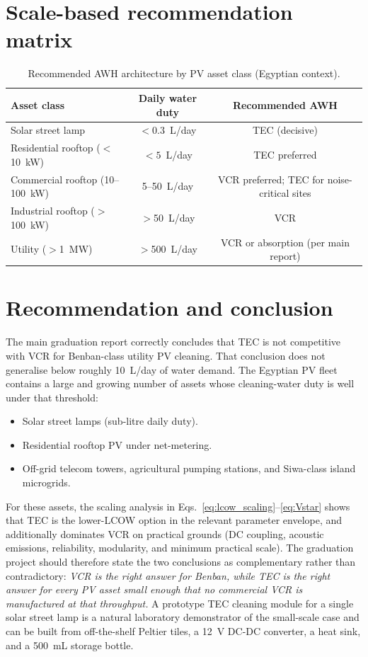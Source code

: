 \documentclass[11pt,a4paper]{article}
\begin{document}
\section{Scale-based recommendation matrix}
\begin{table}[h]
\centering
\caption{Recommended AWH architecture by PV asset class (Egyptian context).}
\begin{tabular}{@{}lcc@{}}
\toprule
\textbf{Asset class} & \textbf{Daily water duty} & \textbf{Recommended AWH} \\
\midrule
Solar street lamp                & $<0.3$~L/day            & TEC (decisive) \\
Residential rooftop ($<$10~kW)   & $<5$~L/day              & TEC preferred \\
Commercial rooftop (10--100~kW)  & 5--50~L/day             & VCR preferred; TEC for noise-critical sites \\
Industrial rooftop ($>$100~kW)   & $>$50~L/day             & VCR \\
Utility ($>$1~MW)                & $>$500~L/day            & VCR or absorption (per main report) \\
\bottomrule
\end{tabular}
\end{table}

\section{Recommendation and conclusion}
The main graduation report correctly concludes that TEC is not competitive with VCR for Benban-class utility PV cleaning. That conclusion does not generalise below roughly 10~L/day of water demand. The Egyptian PV fleet contains a large and growing number of assets whose cleaning-water duty is well under that threshold:
\begin{itemize}[nosep]
\item Solar street lamps (sub-litre daily duty).
\item Residential rooftop PV under net-metering.
\item Off-grid telecom towers, agricultural pumping stations, and Siwa-class island microgrids.
\end{itemize}
For these assets, the scaling analysis in Eqs.~\eqref{eq:lcow_scaling}--\eqref{eq:Vstar} shows that TEC is the lower-LCOW option in the relevant parameter envelope, and additionally dominates VCR on practical grounds (DC coupling, acoustic emissions, reliability, modularity, and minimum practical scale). The graduation project should therefore state the two conclusions as complementary rather than contradictory: \emph{VCR is the right answer for Benban, while TEC is the right answer for every PV asset small enough that no commercial VCR is manufactured at that throughput.} A prototype TEC cleaning module for a single solar street lamp is a natural laboratory demonstrator of the small-scale case and can be built from off-the-shelf Peltier tiles, a 12~V DC-DC converter, a heat sink, and a 500~mL storage bottle.
\end{document}
